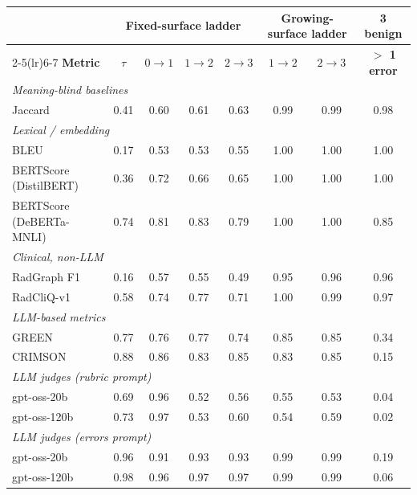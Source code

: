 \begin{tabular}{lccccccc}
\toprule
 & \multicolumn{4}{c}{\textbf{Fixed-surface ladder}} & \multicolumn{2}{c}{\textbf{Growing-surface ladder}} & \textbf{3 benign} \\
\cmidrule(lr){2-5}\cmidrule(lr){6-7}
\textbf{Metric} & $\tau$ & $0{\to}1$ & $1{\to}2$ & $2{\to}3$ & $1{\to}2$ & $2{\to}3$ & \textbf{$>$ 1 error} \\
\midrule
\multicolumn{8}{l}{\textit{Meaning-blind baselines}} \\
Jaccard & 0.41 & 0.60 & 0.61 & 0.63 & 0.99 & 0.99 & 0.98 \\
\multicolumn{8}{l}{\textit{Lexical / embedding}} \\
BLEU & 0.17 & 0.53 & 0.53 & 0.55 & 1.00 & 1.00 & 1.00 \\
BERTScore (DistilBERT) & 0.36 & 0.72 & 0.66 & 0.65 & 1.00 & 1.00 & 1.00 \\
BERTScore (DeBERTa-MNLI) & 0.74 & 0.81 & 0.83 & 0.79 & 1.00 & 1.00 & 0.85 \\
\multicolumn{8}{l}{\textit{Clinical, non-LLM}} \\
RadGraph F1 & 0.16 & 0.57 & 0.55 & 0.49 & 0.95 & 0.96 & 0.96 \\
RadCliQ-v1 & 0.58 & 0.74 & 0.77 & 0.71 & 1.00 & 0.99 & 0.97 \\
\multicolumn{8}{l}{\textit{LLM-based metrics}} \\
GREEN & 0.77 & 0.76 & 0.77 & 0.74 & 0.85 & 0.85 & 0.34 \\
CRIMSON & 0.88 & 0.86 & 0.83 & 0.85 & 0.83 & 0.85 & 0.15 \\
\multicolumn{8}{l}{\textit{LLM judges (rubric prompt)}} \\
gpt-oss-20b & 0.69 & 0.96 & 0.52 & 0.56 & 0.55 & 0.53 & 0.04 \\
gpt-oss-120b & 0.73 & 0.97 & 0.53 & 0.60 & 0.54 & 0.59 & 0.02 \\
\multicolumn{8}{l}{\textit{LLM judges (errors prompt)}} \\
gpt-oss-20b & 0.96 & 0.91 & 0.93 & 0.93 & 0.99 & 0.99 & 0.19 \\
gpt-oss-120b & 0.98 & 0.96 & 0.97 & 0.97 & 0.99 & 0.99 & 0.06 \\
\bottomrule
\end{tabular}